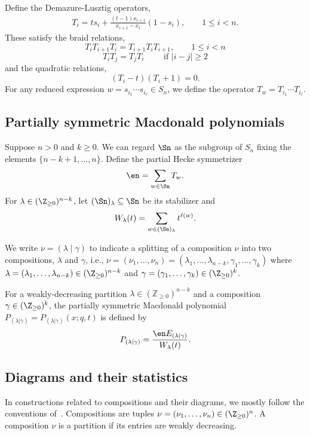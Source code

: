 Define the Demazure-Lusztig operators,
\begin{align*}
T_i = ts_i + \frac{(t-1)x_{i+1}}{x_{i+1}-x_i}(1-s_i), \qquad 1\le i<n.
\end{align*}
These satisfy the braid relations,
\begin{equation}\label{braidrelations}T_i T_{i+1} T_i = T_{i+1} T_i T_{i+1}, \qquad 1\leq i < n\end{equation}
\begin{equation} T_i T_j = T_j T_i \qquad \text{ if } |i-j|\geq 2\end{equation}
and the quadratic relations,
\begin{equation}\label{quadratic}
(T_i-t)(T_i+1)=0.
\end{equation}
For any reduced expression $w=s_{i_1}\dotsm s_{i_\ell}\in S_n$, we define the operator $T_w=T_{i_1}\dotsm T_{i_\ell}$. 

\subsection{Partially symmetric Macdonald polynomials}
Suppose $n>0$ and $k\geq 0$. We can regard $\Sn$ as the subgroup of $S_n$ fixing the elements $\{n-k+1,\dotsc,n\}$. Define the partial Hecke symmetrizer
$$
\en=\sum_{w\in \Sn} T_w.
$$
For $\lambda\in(\Z_{\ge 0})^{n-k}$, let $(\Sn)_\lambda\subseteq \Sn$ be its stabilizer and
\begin{align*}
W_\lambda(t)=\sum_{w\in (\Sn)_\lambda} t^{\ell(w)}.
\end{align*}


We write $\nu = (\lambda \mid \gamma)$ to indicate a splitting of a composition $\nu$ into two compositions, $\lambda$ and $\gamma$, i.e., $\nu=(\nu_1,\dotsc,\nu_n)=(\lambda_1,\dotsc,\lambda_{n-k},\gamma_1,\dotsc,\gamma_k)$ where $\lambda=(\lambda_1,\dotsc,\lambda_{n-k})\in(\Z_{\ge 0})^{n-k}$ and $\gamma=(\gamma_1,\dotsc,\gamma_k)\in(\Z_{\ge 0})^k$.

\begin{defi}
For a weakly-decreasing partition $\lambda \in (\mathbb{Z}_{\geq 0})^{n-k}$ and a composition $\gamma\in (\Z_{\ge 0})^k$, the partially symmetric Macdonald polynomial $P_{(\lambda|\gamma)}=P_{(\lambda|\gamma)}(x;q,t)$ is defined by
\[
P_{(\lambda|\gamma)} = \frac{\en  E_{(\lambda|\gamma)}}{W_\lambda(t)}.
\]
\end{defi}





\subsection{Diagrams and their statistics}\label{diagrams} In constructions related to compositions and their diagrams, we mostly follow the conventions of~\cite{MR2405160}. Compositions are tuples $\nu=(\nu_1,\dotsc,\nu_n)\in(\Z_{\ge 0})^n$. A composition $\nu$ is a partition if its entries are weakly decreasing. 

